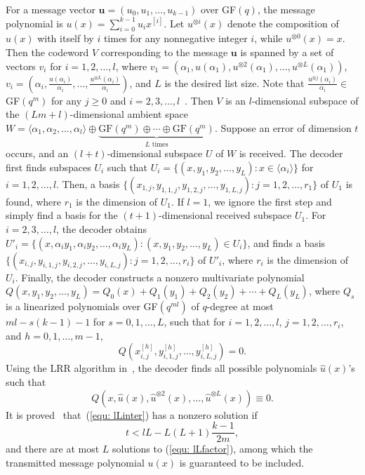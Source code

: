 \documentclass[11pt,onecolumn,draftcls]{IEEEtran}
\begin{document}
For a message vector $\mathbf{u} = (u_0, u_1, \ldots, u_{k-1})$ over GF$(q)$, the message polynomial is $u(x) = \sum_{i=0}^{k-1} u_i x^{[i]}$. Let $u^{\otimes i}(x)$ denote the composition of $u(x)$ with itself by $i$ times for any nonnegative integer $i$, while $u^{\otimes 0 }(x) =x$. Then the codeword $V$ corresponding to the message $\mathbf{u}$ is spanned by a set of vectors $v_i$ for $i = 1,2,\ldots, l$, where $v_1 = (\alpha_1, u(\alpha_1), u^{\otimes 2}(\alpha_1), \ldots, u^{\otimes L}(\alpha_1))$, $v_i = (\alpha_i, \frac{u(\alpha_i)}{\alpha_i},\ldots, \frac{u^{\otimes L}(\alpha_i)}{\alpha_i})$, and $L$ is the desired list size. Note that $\frac{u^{\otimes j}(\alpha_i)}{\alpha_i} \in$ GF$(q^m)$ for any $j \ge 0$ and $i=2,3,\ldots, l$~\cite{mahdavifar_it10}. Then $V$ is an $l$-dimensional subspace of the $(Lm+l)$-dimensional ambient space $W = \langle \alpha_1, \alpha_2,\ldots, \alpha_l \rangle \oplus \underbrace{ \textrm{GF}(q^m) \oplus \cdots \oplus \textrm{GF}(q^m)}_{L\textrm{ times}}$. Suppose an error of dimension $t$ occurs, and an $(l+t)$-dimensional subspace $U$ of $W$ is received. The decoder first finds subspaces $U_i$ such that $U_i = \{ (x, y_1, y_2, \ldots, y_L) : x \in \langle \alpha_i \rangle\}$ for $i=1,2,\ldots,l$. Then, a basis $\{(x_{1,j}, y_{1,1,j}, y_{1,2,j},\ldots, y_{1, L, j}): j = 1, 2, \ldots, r_1\}$ of $U_1$ is found, where $r_1$ is the dimension of $U_1$. If $l=1$, we ignore the first step and simply find a basis for the $(t+1)$-dimensional received subspace $U_1$. For $i = 2, 3, \ldots, l$, the decoder obtains $U'_i = \{ (x, \alpha_i y_1, \alpha_i y_2, \ldots, \alpha_i y_L) : (x, y_1, y_2, \ldots, y_L) \in U_i\}$, and finds a basis $\{(x_{i,j}, y_{i,1,j}, y_{i,2,j},\ldots, y_{i, L, j}): j = 1, 2, \ldots, r_i\}$ of $U'_i$, where $r_i$ is the dimension of $U_i$. Finally, the decoder constructs a nonzero multivariate polynomial $Q(x, y_1, y_2, \ldots, y_L)= Q_0(x) + Q_1(y_1) + Q_2(y_2) + \cdots + Q_L(y_L)$, where $Q_s$ is a linearized polynomials over GF$(q^{ml})$ of $q$-degree at most $ml -s(k-1) - 1$ for $s = 0, 1, \ldots, L $, such that for $i= 1,2,\ldots, l$, $j = 1,2, \ldots, r_i$, and $h = 0,1,\ldots, m-1$,
\begin{equation} \label{equ: lLinter}
Q(x_{i,j}^{[h]}, y_{i,1,j}^{[h]}, \ldots, y_{i, L, j}^{[h]}) = 0.
\end{equation}
Using the LRR algorithm in~\cite{mahdavifar_isit10}, the decoder finds all possible polynomials $\hat{u}(x)$'s such that
\begin{equation} \label{equ: lLfactor}
Q(x, \hat{u}(x), \hat{u}^{\otimes 2}(x),\ldots,\hat{u}^{\otimes L}(x)) \equiv 0.
\end{equation}
It is proved~\cite{mahdavifar_it10} that~(\ref{equ: lLinter}) has a nonzero solution if
\begin{equation} \label{equ: lLcondition}
t < lL -L(L+1)\frac{k-1}{2m},
\end{equation}
and there are at most $L$ solutions to (\ref{equ: lLfactor}), among which the transmitted message polynomial $u(x)$ is guaranteed to be included.
\end{document}
